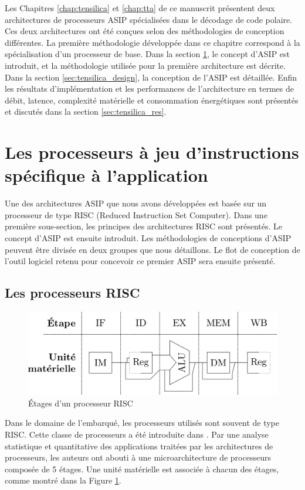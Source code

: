 Les Chapitres \ref{chap:tensilica} et \ref{chap:tta} de ce manuscrit présentent deux architectures de processeurs ASIP spécialisées dans le décodage de code polaire. Ces deux architectures ont été conçues selon des méthodologies de conception différentes. La première méthodologie développée dans ce chapitre correspond à la spécialisation d'un processeur de base. Dans la section \ref{sec:asips}, le concept d'ASIP est introduit, et la méthodologie utilisée pour la première architecture est décrite. Dans la section \ref{sec:tensilica_design}, la conception de l'ASIP est détaillée. Enfin les résultats d'implémentation et les performances de l'architecture en termes de débit, latence, complexité matérielle et consommation énergétiques sont présentés et discutés dans la section \ref{sec:tensilica_res}.


\section{Les processeurs à jeu d'instructions spécifique à l'application}
\label{sec:asips}

Une des architectures ASIP que nous avons développées est basée sur un processeur de type RISC (Reduced Instruction Set Computer). Dans une première sous-section, les principes des architectures RISC sont présentés. Le concept d'ASIP est ensuite introduit. Les méthodologies de conceptions d'ASIP peuvent être divisée en deux groupes que nous détaillons. Le flot de conception de l'outil logiciel retenu pour concevoir ce premier ASIP sera ensuite présenté.

\subsection{Les processeurs RISC}
\label{subsec:risc}
\begin{figure}[t]
\centering
\includegraphics[width=\textwidth]{main/ch3_fig/stages}
\caption{\'Etages d'un processeur RISC}
\label{fig:risc}
\end{figure}

Dans le domaine de l'embarqué, les processeurs utilisés sont souvent de type RISC. Cette classe de processeurs a été introduite dans \cite{hennessy2011computer}. Par une analyse statistique et quantitative des applications traitées par les architectures de processeurs, les auteurs ont abouti à une microarchitecture de processeurs composée de 5 étages. Une unité matérielle est associée à chacun des étages, comme montré dans la Figure \ref{fig:risc}.

